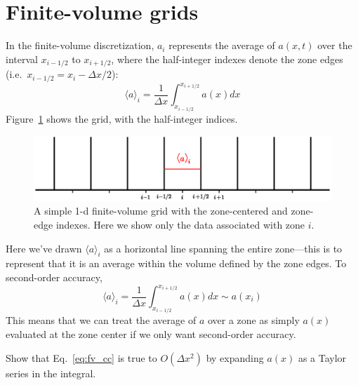 \section{Finite-volume grids}

In the finite-volume discretization, $a_i$ represents the average of
$a(x,t)$ over the interval $x_{i-1/2}$ to $x_{i+1/2}$, where the
half-integer indexes denote the zone edges (i.e.\ $x_{i-1/2} = x_i -
\Delta x/2$):
\begin{equation}
\label{eq:fv_cc-a}
\langle a\rangle_i = \frac{1}{\Delta x} \int_{x_{i-1/2}}^{x_{i+1/2}} a(x) dx 
\end{equation}
Figure~\ref{fig:simplefv} shows the grid, with the half-integer indices.
%
\begin{figure}[t]
\centering
\includegraphics[width=\linewidth]{simplegrid2}
\caption[A simple 1-d finite-volume grid]{\label{fig:simplefv} A simple 1-d finite-volume
  grid with the zone-centered and zone-edge indexes.  Here we show
  only the data associated with zone $i$.}
\end{figure}
%
Here we've drawn $\langle a\rangle_i$ as a horizontal line spanning the entire zone---this 
is to represent that it is an average within the volume defined by the zone
edges.
%
To second-order accuracy,
\begin{equation}
\label{eq:fv_cc}
\langle a\rangle_i = \frac{1}{\Delta x} \int_{x_{i-1/2}}^{x_{i+1/2}} a(x) dx \sim a(x_i) 
\end{equation}
This means that we can treat the average of $a$ over a zone as simply $a(x)$
evaluated at the zone center if we only want second-order accuracy.

\begin{exercise}
{Show that Eq.~\ref{eq:fv_cc} is true to $O(\Delta x^2)$ by expanding
$a(x)$ as a Taylor series in the integral.}
\end{exercise}

